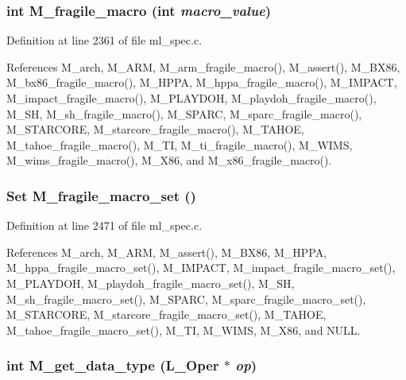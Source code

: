 \subsubsection{\setlength{\rightskip}{0pt plus 5cm}int M\_\-fragile\_\-macro (int {\em macro\_\-value})}\label{m__spec_8h_889a8be69ebae30d0f5af018f747ead4}




Definition at line 2361 of file ml\_\-spec.c.

References M\_\-arch, M\_\-ARM, M\_\-arm\_\-fragile\_\-macro(), M\_\-assert(), M\_\-BX86, M\_\-bx86\_\-fragile\_\-macro(), M\_\-HPPA, M\_\-hppa\_\-fragile\_\-macro(), M\_\-IMPACT, M\_\-impact\_\-fragile\_\-macro(), M\_\-PLAYDOH, M\_\-playdoh\_\-fragile\_\-macro(), M\_\-SH, M\_\-sh\_\-fragile\_\-macro(), M\_\-SPARC, M\_\-sparc\_\-fragile\_\-macro(), M\_\-STARCORE, M\_\-starcore\_\-fragile\_\-macro(), M\_\-TAHOE, M\_\-tahoe\_\-fragile\_\-macro(), M\_\-TI, M\_\-ti\_\-fragile\_\-macro(), M\_\-WIMS, M\_\-wims\_\-fragile\_\-macro(), M\_\-X86, and M\_\-x86\_\-fragile\_\-macro().
\subsubsection{\setlength{\rightskip}{0pt plus 5cm}\bf{Set} M\_\-fragile\_\-macro\_\-set ()}\label{m__spec_8h_a4e0e1630d6bb3e9e647315e96c04d9e}




Definition at line 2471 of file ml\_\-spec.c.

References M\_\-arch, M\_\-ARM, M\_\-assert(), M\_\-BX86, M\_\-HPPA, M\_\-hppa\_\-fragile\_\-macro\_\-set(), M\_\-IMPACT, M\_\-impact\_\-fragile\_\-macro\_\-set(), M\_\-PLAYDOH, M\_\-playdoh\_\-fragile\_\-macro\_\-set(), M\_\-SH, M\_\-sh\_\-fragile\_\-macro\_\-set(), M\_\-SPARC, M\_\-sparc\_\-fragile\_\-macro\_\-set(), M\_\-STARCORE, M\_\-starcore\_\-fragile\_\-macro\_\-set(), M\_\-TAHOE, M\_\-tahoe\_\-fragile\_\-macro\_\-set(), M\_\-TI, M\_\-WIMS, M\_\-X86, and NULL.
\subsubsection{\setlength{\rightskip}{0pt plus 5cm}int M\_\-get\_\-data\_\-type (L\_\-Oper $\ast$ {\em op})}\label{m__spec_8h_bb083fbe2d3784a7d301a9429203cd0e}




